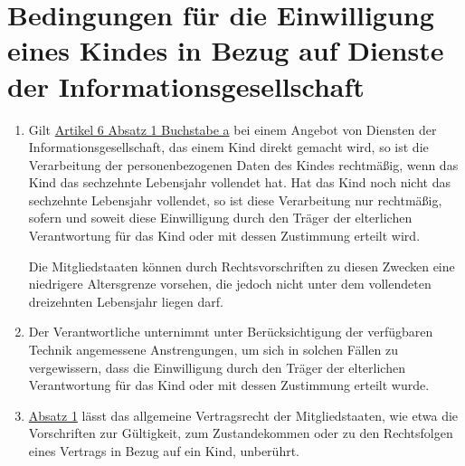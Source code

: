 \chapter{Bedingungen für die Einwilligung eines Kindes in Bezug auf Dienste der Informationsgesellschaft}
\label{ch:08}


\begin{enumerate}

  \item Gilt \hyperref[itm:06-1a]{Artikel 6 Absatz 1 Buchstabe a} bei einem Angebot von Diensten der
   Informationsgesellschaft, das einem Kind direkt gemacht wird, so ist die Verarbeitung der personenbezogenen Daten
   des Kindes rechtmäßig, wenn das Kind das sechzehnte Lebensjahr vollendet hat. Hat das Kind noch nicht das sechzehnte
   Lebensjahr vollendet, so ist diese Verarbeitung nur rechtmäßig, sofern und soweit diese Einwilligung durch den
   Träger der elterlichen Verantwortung für das Kind oder mit dessen Zustimmung erteilt wird. 
  \label{itm:08-1}

   Die Mitgliedstaaten können durch Rechtsvorschriften zu diesen Zwecken eine niedrigere Altersgrenze vorsehen, die
   jedoch nicht unter dem vollendeten dreizehnten Lebensjahr liegen darf.

  \item Der Verantwortliche unternimmt unter Berücksichtigung der verfügbaren Technik angemessene Anstrengungen, um sich
   in solchen Fällen zu vergewissern, dass die Einwilligung durch den Träger der elterlichen Verantwortung für das Kind
   oder mit dessen Zustimmung erteilt wurde.
  \label{itm:08-2}

  \item \hyperref[itm:08-1]{Absatz 1} lässt das allgemeine Vertragsrecht der Mitgliedstaaten, wie etwa die Vorschriften
   zur Gültigkeit, zum Zustandekommen oder zu den Rechtsfolgen eines Vertrags in Bezug auf ein Kind, unberührt.
  \label{itm:08-3}

\end{enumerate}


